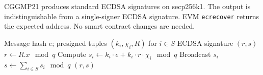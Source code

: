 CGGMP21 produces standard ECDSA signatures on secp256k1. The output is
indistinguishable from a single-signer ECDSA signature. EVM \texttt{ecrecover}
returns the expected address. No smart contract changes are needed.

\begin{algorithm}[ht]
\caption{CGGMP21 Signing (simplified).}
\label{alg:cggmp21}
\begin{algorithmic}[1]
\Require Message hash $e$; presigned tuples $(k_i, \chi_i, R)$ for $i \in S$
\Ensure ECDSA signature $(r, s)$
\State $r \leftarrow R.x \mod q$ 
  \State Compute $s_i \leftarrow k_i \cdot e + k_i \cdot r \cdot \chi_i \mod q$
  \State Broadcast $s_i$
\EndFor
\State $s \leftarrow \sum_{i \in S} s_i \mod q$
\State \Return $(r, s)$
\end{algorithmic}
\end{algorithm}

